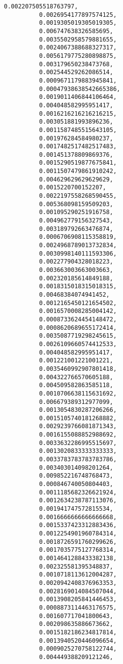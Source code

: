 \documentclass[11pt]{article}
\begin{document}
\begin{Verbatim}[commandchars=\\\{\}]
          0.002207505518763797,
          0.0026954177897574125,
          0.0019305019305019305,
          0.006747638326585695,
          0.0035502958579881655,
          0.0024067388688327317,
          0.0056179775280898875,
          0.003179650238473768,
          0.002544529262086514,
          0.0009671179883945841,
          0.00047938638542665386,
          0.0019011406844106464,
          0.004048582995951417,
          0.0016216216216216215,
          0.003051881993896236,
          0.0011587485515643105,
          0.001976284584980237,
          0.0017482517482517483,
          0.001451378809869376,
          0.0015290519877675841,
          0.0011507479861910242,
          0.004629629629629629,
          0.0015220700152207,
          0.0022197558268590455,
          0.005368098159509203,
          0.001095290251916758,
          0.004962779156327543,
          0.003189792663476874,
          0.0006706908115358819,
          0.0024968789013732834,
          0.0030998140111593306,
          0.002277904328018223,
          0.003663003663003663,
          0.002320185614849188,
          0.0018315018315018315,
          0.00468384074941452,
          0.0012165450121654502,
          0.0016570008285004142,
          0.0008733624454148472,
          0.0008620689655172414,
          0.0035087719298245615,
          0.0026109660574412533,
          0.004048582995951417,
          0.001221001221001221,
          0.0035460992907801418,
          0.004322766570605188,
          0.004509582863585118,
          0.0010706638115631692,
          0.006679389312977099,
          0.0013054830287206266,
          0.0015105740181268882,
          0.0029239766081871343,
          0.0016155088852988692,
          0.0033632286995515697,
          0.0013020833333333333,
          0.0033783783783783786,
          0.003403014098201264,
          0.009852216748768473,
          0.000846740050804403,
          0.0011185682326621924,
          0.0012634238787113076,
          0.001941747572815534,
          0.0016666666666666668,
          0.0015337423312883436,
          0.0012254901960784314,
          0.0018726591760299626,
          0.0017035775127768314,
          0.0014641288433382138,
          0.002325581395348837,
          0.0010718113612004287,
          0.0020942408376963353,
          0.0028169014084507044,
          0.0013908205841446453,
          0.0008873114463176575,
          0.001607717041800643,
          0.002098635886673662,
          0.0015182186234817814,
          0.0013940520446096654,
          0.0009025270758122744,
          0.004449388209121246,

\end{Verbatim}
\end{document}
